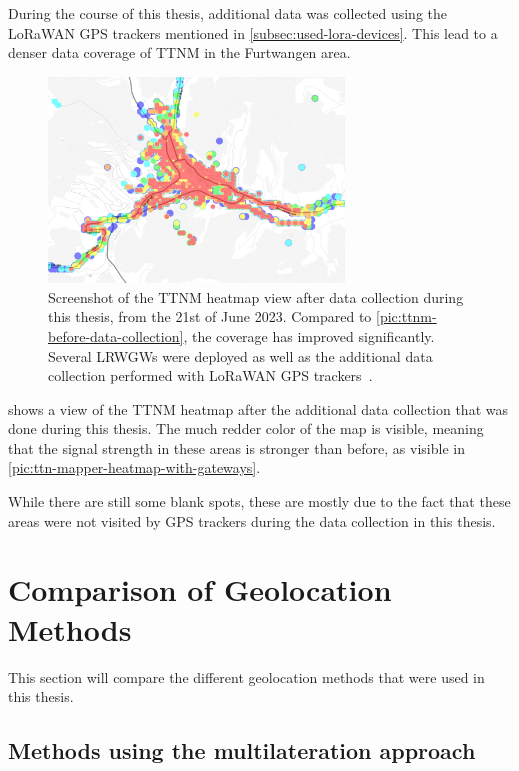 During the course of this thesis, additional data was collected using the \ac{LoRaWAN} \ac{GPS} trackers mentioned in \cref{subsec:used-lora-devices}.
This lead to a denser data coverage of \acl{TTNM} in the Furtwangen area.

\begin{figure}[htbp]
    \centering
    \includegraphics[width=0.7\textwidth]{pictures/ttn-mapper/ttnm_heatmap_after_data_collection.jpg}
    \caption{
        Screenshot of the \ac{TTNM} heatmap view after data collection during this thesis, from the 21st of June 2023.
        Compared to \cref{pic:ttnm-before-data-collection}, the coverage has improved significantly.
        Several \aclp{LRWGW} were deployed as well as the additional data collection performed with \ac{LoRaWAN} \ac{GPS} trackers~\cite{ttn_mapper_ttn_2023}.
    }\label{pic:ttnm-heatmap-after-data-collection}
\end{figure}

 shows a view of the \ac{TTNM} heatmap after the additional data collection that was done during this thesis.
The much redder color of the map is visible, meaning that the signal strength in these areas is stronger than before, as visible in \cref{pic:ttn-mapper-heatmap-with-gateways}.

While there are still some blank spots, these are mostly due to the fact that these areas were not visited by \ac{GPS} trackers during the data collection in this thesis.

\section{Comparison of Geolocation Methods}

This section will compare the different geolocation methods that were used in this thesis.

\subsection{Methods using the multilateration approach}\label{subsec:conclusion-multilateration}

